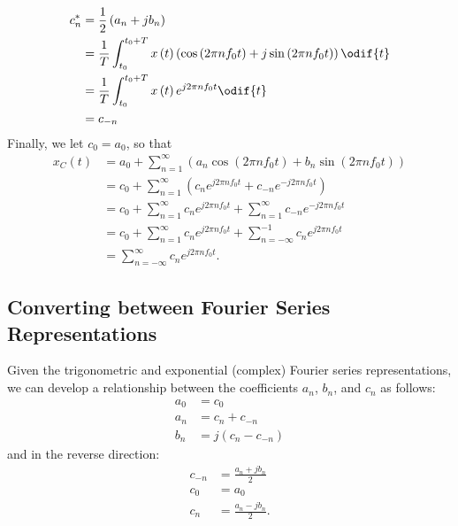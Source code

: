 \documentclass{article}
\begin{document}
\begin{align*}
    c_n^\ast & = \frac{1}{2} \left( a_n + j b_n \right)                                                                                                             \\
             & = \frac{1}{T} \int_{t_0}^{t_0 + T} x\left( t \right) \left( \cos{\left( 2\pi n f_0 t \right)} + j \sin{\left( 2\pi n f_0 t \right)} \right) \odif{t} \\
             & = \frac{1}{T} \int_{t_0}^{t_0 + T} x\left( t \right) e^{j 2\pi n f_0 t} \odif{t}                                                                     \\
             & = c_{-n}
\end{align*}
Finally, we let \(c_0 = a_0\), so that
\begin{align*}
    x_C\left( t \right) & = a_0 + \sum_{n = 1}^\infty \left( a_n \cos{\left( 2\pi n f_0 t \right)} + b_n \sin{\left( 2\pi n f_0 t \right)} \right) \\
                        & = c_0 + \sum_{n = 1}^\infty \left( c_n e^{j 2\pi n f_0 t} + c_{-n} e^{-j 2\pi n f_0 t} \right)                           \\
                        & = c_0 + \sum_{n = 1}^\infty c_n e^{j 2\pi n f_0 t} + \sum_{n = 1}^\infty c_{-n} e^{-j 2\pi n f_0 t}                      \\
                        & = c_0 + \sum_{n = 1}^\infty c_n e^{j 2\pi n f_0 t} + \sum_{n = -\infty}^{-1} c_{n} e^{j 2\pi n f_0 t}                    \\
                        & = \sum_{n = -\infty}^\infty c_n e^{j 2\pi n f_0 t}.
\end{align*}
\subsection{Converting between Fourier Series Representations}
Given the trigonometric and exponential (complex) Fourier series
representations, we can develop a relationship between the
coefficients \(a_n\), \(b_n\), and \(c_n\) as follows:
\begin{align*}
    a_0 & = c_0                           \\
    a_n & = c_n + c_{-n}                  \\
    b_n & = j \left( c_n - c_{-n} \right)
\end{align*}
and in the reverse direction:
\begin{align*}
    c_{-n} & = \frac{a_n + j b_n}{2}  \\
    c_0    & = a_0                    \\
    c_n    & = \frac{a_n - j b_n}{2}.
\end{align*}
\end{document}
